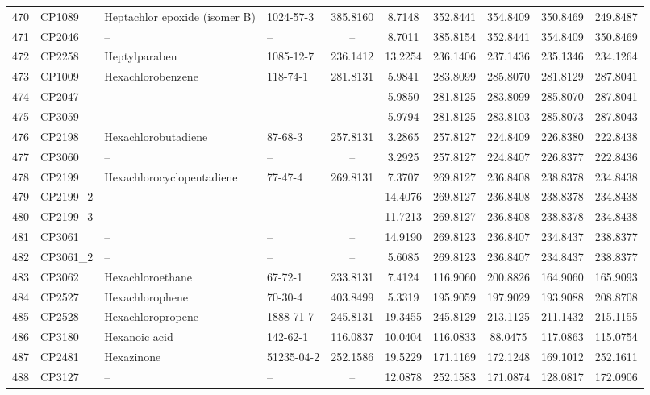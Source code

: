\begin{longtable}{clllcccccc}
470 & CP1089 & Heptachlor epoxide (isomer B) & 1024-57-3 & 385.8160 & 8.7148 & 352.8441 & 354.8409 & 350.8469 & 249.8487 \\ 
471 & CP2046 & – & – & – & 8.7011 & 385.8154 & 352.8441 & 354.8409 & 350.8469 \\ 
472 & CP2258 & Heptylparaben & 1085-12-7 & 236.1412 & 13.2254 & 236.1406 & 237.1436 & 235.1346 & 234.1264 \\ 
473 & CP1009 & Hexachlorobenzene & 118-74-1 & 281.8131 & 5.9841 & 283.8099 & 285.8070 & 281.8129 & 287.8041 \\ 
474 & CP2047 & – & – & – & 5.9850 & 281.8125 & 283.8099 & 285.8070 & 287.8041 \\ 
475 & CP3059 & – & – & – & 5.9794 & 281.8125 & 283.8103 & 285.8073 & 287.8043 \\ 
476 & CP2198 & Hexachlorobutadiene & 87-68-3 & 257.8131 & 3.2865 & 257.8127 & 224.8409 & 226.8380 & 222.8438 \\ 
477 & CP3060 & – & – & – & 3.2925 & 257.8127 & 224.8407 & 226.8377 & 222.8436 \\ 
478 & CP2199 & Hexachlorocyclopentadiene & 77-47-4 & 269.8131 & 7.3707 & 269.8127 & 236.8408 & 238.8378 & 234.8438 \\ 
479 & CP2199\_2 & – & – & – & 14.4076 & 269.8127 & 236.8408 & 238.8378 & 234.8438 \\ 
480 & CP2199\_3 & – & – & – & 11.7213 & 269.8127 & 236.8408 & 238.8378 & 234.8438 \\ 
481 & CP3061 & – & – & – & 14.9190 & 269.8123 & 236.8407 & 234.8437 & 238.8377 \\ 
482 & CP3061\_2 & – & – & – & 5.6085 & 269.8123 & 236.8407 & 234.8437 & 238.8377 \\ 
483 & CP3062 & Hexachloroethane & 67-72-1 & 233.8131 & 7.4124 & 116.9060 & 200.8826 & 164.9060 & 165.9093 \\ 
484 & CP2527 & Hexachlorophene & 70-30-4 & 403.8499 & 5.3319 & 195.9059 & 197.9029 & 193.9088 & 208.8708 \\ 
485 & CP2528 & Hexachloropropene & 1888-71-7 & 245.8131 & 19.3455 & 245.8129 & 213.1125 & 211.1432 & 215.1155 \\ 
486 & CP3180 & Hexanoic acid\smash{\textsuperscript{\textdaggerdbl}} & 142-62-1 & 116.0837 & 10.0404 & 116.0833 & 88.0475 & 117.0863 & 115.0754 \\ 
487 & CP2481 & Hexazinone & 51235-04-2 & 252.1586 & 19.5229 & 171.1169 & 172.1248 & 169.1012 & 252.1611 \\ 
488 & CP3127 & – & – & – & 12.0878 & 252.1583 & 171.0874 & 128.0817 & 172.0906 \\ 

\end{longtable}
